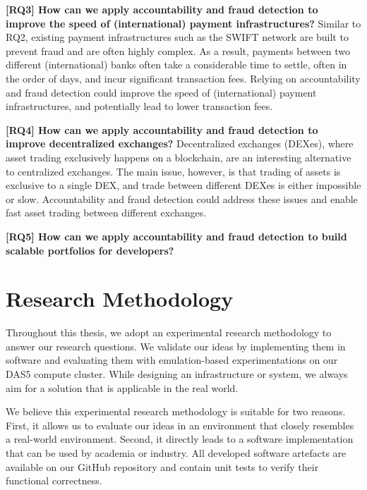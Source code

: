 \textbf{[RQ3] How can we apply accountability and fraud detection to improve the speed of (international) payment infrastructures?}
Similar to RQ2, existing payment infrastructures such as the SWIFT network are built to prevent fraud and are often highly complex.
As a result, payments between two different (international) banks often take a considerable time to settle, often in the order of days, and incur significant transaction fees.
Relying on accountability and fraud detection could improve the speed of (international) payment infrastructures, and potentially lead to lower transaction fees.

\textbf{[RQ4] How can we apply accountability and fraud detection to improve decentralized exchanges?}
Decentralized exchanges (DEXes), where asset trading exclusively happens on a blockchain, are an interesting alternative to centralized exchanges.
The main issue, however, is that trading of assets is exclusive to a single DEX, and trade between different DEXes is either impossible or slow.
Accountability and fraud detection could address these issues and enable fast asset trading between different exchanges.

\textbf{[RQ5] How can we apply accountability and fraud detection to build scalable portfolios for developers?}
\todo{}

\section{Research Methodology}


Throughout this thesis, we adopt an experimental research methodology to answer our research questions.
We validate our ideas by implementing them in software and evaluating them with emulation-based experimentations on our DAS5 compute cluster.
While designing an infrastructure or system, we always aim for a solution that is applicable in the real world.

We believe this experimental research methodology is suitable for two reasons.
First, it allows us to evaluate our ideas in an environment that closely resembles a real-world environment.
Second, it directly leads to a software implementation that can be used by academia or industry.
All developed software artefacts are available on our GitHub repository and contain unit tests to verify their functional correctness.


